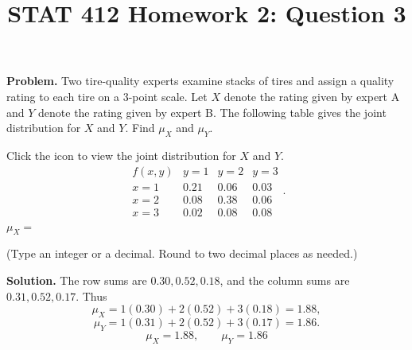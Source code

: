 \documentclass[11pt]{article}
\title{STAT 412 Homework 2: Question 3}
\author{}
\date{}
\begin{document}
\maketitle
\textbf{Problem.} Two tire-quality experts examine stacks of tires and assign a
quality rating to each tire on a 3-point scale. Let \(X\) denote the rating
given by expert A and \(Y\) denote the rating given by expert B. The following
table gives the joint distribution for \(X\) and \(Y\). Find \(\mu_X\) and
\(\mu_Y\).

Click the icon to view the joint distribution for \(X\) and \(Y\).
\[
\begin{array}{c|ccc}
f(x,y)&y=1&y=2&y=3\\\hline
x=1&0.21&0.06&0.03\\
x=2&0.08&0.38&0.06\\
x=3&0.02&0.08&0.08
\end{array}.
\]
\(\mu_X=\boxed{\phantom{0.00}}\)

(Type an integer or a decimal. Round to two decimal places as needed.)

\textbf{Solution.} The row sums are \(0.30,0.52,0.18\), and the column sums are
\(0.31,0.52,0.17\). Thus
\[
\mu_X=1(0.30)+2(0.52)+3(0.18)=1.88,
\]
\[
\mu_Y=1(0.31)+2(0.52)+3(0.17)=1.86.
\]
\[
\boxed{\mu_X=1.88,\qquad \mu_Y=1.86}
\]
\end{document}
